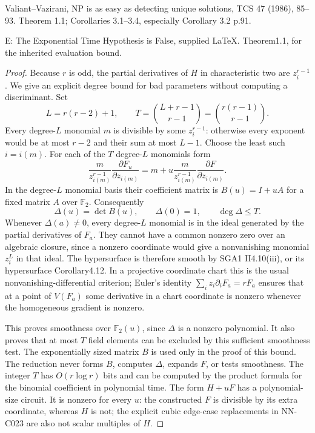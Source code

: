 Valiant--Vazirani, NP is as easy as detecting unique solutions, TCS 47 (1986), 85--93. Theorem 1.1; Corollaries 3.1--3.4, especially Corollary 3.2 p.91.

E: The Exponential Time Hypothesis is False, supplied LaTeX. Theorem1.1, for the inherited evaluation bound.

\begin{proof}
Because $r$ is odd, the partial derivatives of $H$ in characteristic two are $z_i^{r-1}$. We give an explicit degree bound for bad parameters without computing a discriminant. Set
\[
 L=r(r-2)+1,\qquad
 T=\binom{L+r-1}{r-1}=\binom{r(r-1)}{r-1}.
\]
Every degree-$L$ monomial $m$ is divisible by some $z_i^{r-1}$: otherwise every exponent would be at most $r-2$ and their sum at most $L-1$. Choose the least such $i=i(m)$. For each of the $T$ degree-$L$ monomials form
\[
 \frac{m}{z_{i(m)}^{r-1}}\frac{\partial F_u}{\partial z_{i(m)}}
 =m+u\frac{m}{z_{i(m)}^{r-1}}\frac{\partial F}{\partial z_{i(m)}}.
\]
In the degree-$L$ monomial basis their coefficient matrix is $B(u)=I+uA$ for a fixed matrix $A$ over $\mathbb F_2$. Consequently
\[
 \Delta(u)=\det B(u),\qquad \Delta(0)=1,\qquad \deg\Delta\leq T.
\]
Whenever $\Delta(a)\ne0$, every degree-$L$ monomial is in the ideal generated by the partial derivatives of $F_a$. They cannot have a common nonzero zero over an algebraic closure, since a nonzero coordinate would give a nonvanishing monomial $z_i^L$ in that ideal. The hypersurface is therefore smooth by SGA1 II4.10(iii), or its hypersurface Corollary4.12. In a projective coordinate chart this is the usual nonvanishing-differential criterion; Euler's identity $\sum_i z_i\partial_iF_a=rF_a$ ensures that at a point of $V(F_a)$ some derivative in a chart coordinate is nonzero whenever the homogeneous gradient is nonzero.

This proves smoothness over $\mathbb F_2(u)$, since $\Delta$ is a nonzero polynomial. It also proves that at most $T$ field elements can be excluded by this sufficient smoothness test. The exponentially sized matrix $B$ is used only in the proof of this bound. The reduction never forms $B$, computes $\Delta$, expands $F$, or tests smoothness. The integer $T$ has $O(r\log r)$ bits and can be computed by the product formula for the binomial coefficient in polynomial time. The form $H+uF$ has a polynomial-size circuit. It is nonzero for every $u$: the constructed $F$ is divisible by its extra coordinate, whereas $H$ is not; the explicit cubic edge-case replacements in NN-C023 are also not scalar multiples of $H$.


\end{proof}
